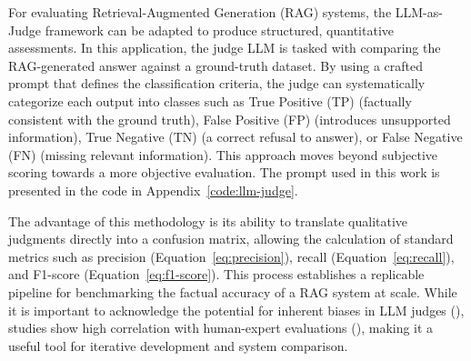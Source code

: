             For evaluating Retrieval-Augmented Generation (RAG) systems, the LLM-as-Judge framework can be adapted to produce structured, quantitative assessments. 
            In this application, the judge LLM is tasked with comparing the RAG-generated answer against a ground-truth dataset.
            By using a crafted prompt that defines the classification criteria, the judge can systematically categorize each output into classes such as True Positive (TP) (factually consistent with the ground truth), False Positive (FP) (introduces unsupported information), True Negative (TN) (a correct refusal to answer), or False Negative (FN) (missing relevant information). This approach moves beyond subjective scoring towards a more objective evaluation. The prompt used in this work is presented in the code in Appendix~\ref{code:llm-judge}.

            The advantage of this methodology is its ability to translate qualitative judgments directly into a confusion matrix, allowing the calculation of standard metrics such as precision (Equation~\ref{eq:precision}), recall (Equation~\ref{eq:recall}), and F1-score (Equation~\ref{eq:f1-score}). This process establishes a replicable pipeline for benchmarking the factual accuracy of a RAG system at scale. While it is important to acknowledge the potential for inherent biases in LLM judges (\citep{Gu2025}), studies show high correlation with human-expert evaluations (\citep{li2024llmsasjudgescomprehensivesurveyllmbased}), making it a useful tool for iterative development and system comparison.


